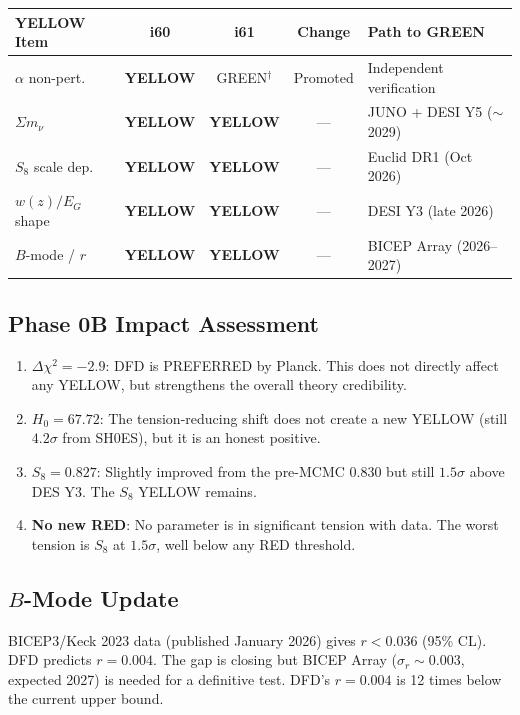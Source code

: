 \documentclass[11pt,a4paper]{article}
\newcommand{\YELLOW}{\textcolor{dfdyellow}{\textbf{YELLOW}}}
\begin{document}
\begin{center}
\begin{longtable}{p{3.5cm}cccp{4.5cm}}
\toprule
\textbf{YELLOW Item} & \textbf{i60} & \textbf{i61} & \textbf{Change} & \textbf{Path to GREEN} \\
\midrule
$\alpha$ non-pert.\ & \YELLOW & GREEN$^\dagger$ & Promoted & Independent verification \\
$\Sigma m_\nu$ & \YELLOW & \YELLOW & --- & JUNO + DESI Y5 ($\sim$2029) \\
$S_8$ scale dep.\ & \YELLOW & \YELLOW & --- & Euclid DR1 (Oct 2026) \\
$w(z)/E_G$ shape & \YELLOW & \YELLOW & --- & DESI Y3 (late 2026) \\
$B$-mode / $r$ & \YELLOW & \YELLOW & --- & BICEP Array (2026--2027) \\
\bottomrule
\end{longtable}
\end{center}

\subsection{Phase 0B Impact Assessment}

\begin{enumerate}
\item \textbf{$\Delta\chi^2 = -2.9$}: DFD is PREFERRED by Planck. This does not directly affect any YELLOW, but strengthens the overall theory credibility.

\item \textbf{$H_0 = 67.72$}: The tension-reducing shift does not create a new YELLOW (still $4.2\sigma$ from SH0ES), but it is an honest positive.

\item \textbf{$S_8 = 0.827$}: Slightly improved from the pre-MCMC 0.830 but still $1.5\sigma$ above DES Y3. The $S_8$ YELLOW remains.

\item \textbf{No new RED}: No parameter is in significant tension with data. The worst tension is $S_8$ at $1.5\sigma$, well below any RED threshold.
\end{enumerate}

\subsection{$B$-Mode Update}

BICEP3/Keck 2023 data (published January 2026) gives $r < 0.036$ (95\% CL). DFD predicts $r = 0.004$. The gap is closing but BICEP Array ($\sigma_r \sim 0.003$, expected 2027) is needed for a definitive test. DFD's $r = 0.004$ is 12 times below the current upper bound.
\end{document}
